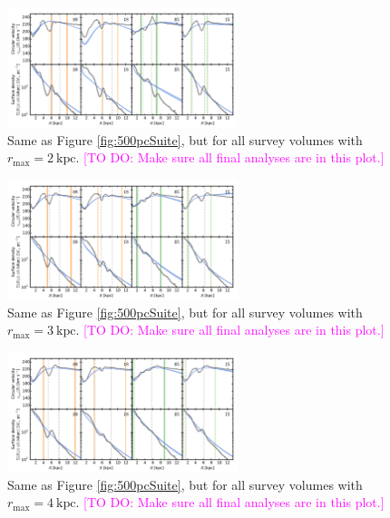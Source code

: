 \documentclass[iop,revtex4,numberedappendix,appendixfloats]{emulateapj}
\newcommand{\Wilma}[1]{\textcolor{Magenta}{#1}}
\begin{document}
\begin{appendix}
\begin{figure}[!htbp]
\centering
\includegraphics[width=0.6\textwidth]{fig/MNdHHdiffSph2_vcirc_surfdens_2kpcSuite.pdf}
\caption{Same as Figure \ref{fig:500pcSuite}, but for all survey volumes with $r_\text{max}=2~\text{kpc}$. \Wilma{[TO DO: Make sure all final analyses are in this plot.]}}
\label{fig:????}
\end{figure}

\begin{figure}[!htbp]
\centering
\includegraphics[width=0.6\textwidth]{fig/MNdHHdiffSph2_vcirc_surfdens_3kpcSuite.pdf}
\caption{Same as Figure \ref{fig:500pcSuite}, but for all survey volumes with $r_\text{max}=3~\text{kpc}$. \Wilma{[TO DO: Make sure all final analyses are in this plot.]}}
\label{fig:????}
\end{figure}

\begin{figure}[!htbp]
\centering
\includegraphics[width=0.6\textwidth]{fig/MNdHHdiffSph2_vcirc_surfdens_4kpcSuite.pdf}
\caption{Same as Figure \ref{fig:500pcSuite}, but for all survey volumes with $r_\text{max}=4~\text{kpc}$. \Wilma{[TO DO: Make sure all final analyses are in this plot.]}}
\label{fig:????}
\end{figure}


\end{appendix}
\end{document}
